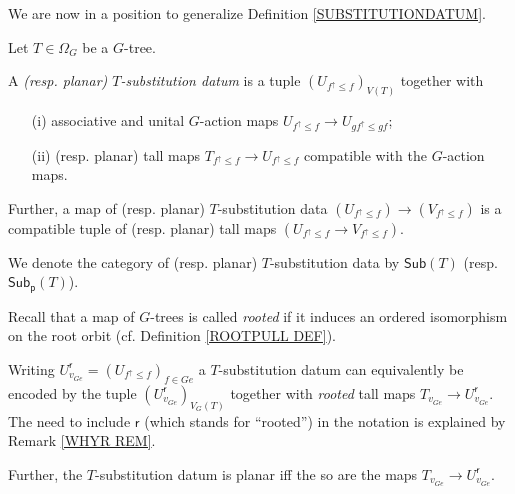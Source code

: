 \documentclass[a4paper,10pt]{article}%
\begin{document}
We are now in a position to generalize 
Definition \ref{SUBSTITUTIONDATUM}.

\begin{definition}\label{SUBSTITUTIONDATUMG DEF}
	Let $T \in \Omega_G$ be a $G$-tree.
	
	A \textit{(resp. planar) $T$-substitution datum} is a tuple 
	$\left(U_{f^{\uparrow} \leq f} \right)_{V(T)}$ together with
\begin{itemize}	
\item[(i)] associative and unital $G$-action maps
$U_{f^{\uparrow} \leq f} \to U_{g f^{\uparrow} \leq g f}$; 
\item[(ii)]	(resp. planar) tall maps 
	$T_{f^{\uparrow} \leq f} \to U_{f^{\uparrow} \leq f}$ compatible with the $G$-action maps.
\end{itemize}	
	Further, a map of (resp. planar) $T$-substitution data 
	$\left(U_{f^{\uparrow} \leq f}\right) \to
	\left(V_{f^{\uparrow} \leq f}\right)$ is a compatible tuple of (resp. planar) tall maps 
	$\left(U_{f^{\uparrow} \leq f} \to V_{f^{\uparrow} \leq f} \right)$.
	
	We denote the category of (resp. planar) $T$-substitution data 
	by $\mathsf{Sub}(T)$
	(resp. $\mathsf{Sub}_{\mathsf{p}}(T)$).
\end{definition}


Recall that a map of $G$-trees is called 
\textit{rooted} if it induces an ordered isomorphism on the root orbit (cf. Definition \ref{ROOTPULL DEF}).

\begin{remark}\label{SUBSGREF DEF}
Writing $U^{\mathsf{r}}_{v_{G e}} = (U_{f^{\uparrow} \leq f})_{f \in Ge}$
a $T$-substitution datum can equivalently be encoded by the tuple
$\left(U^{\mathsf{r}}_{v_{G e}}\right)_{V_G(T)}$ together with \textit{rooted} tall maps 
$T_{v_{Ge}} \to U^{\mathsf{r}}_{v_{G e}}$.
The need to include $\mathsf{r}$ (which stands for ``rooted'')
in the notation is explained by Remark \ref{WHYR REM}.

Further, the $T$-substitution datum is planar iff the so are the maps $T_{v_{Ge}} \to U^{\mathsf{r}}_{v_{G e}}$.
\end{remark}
\end{document}
